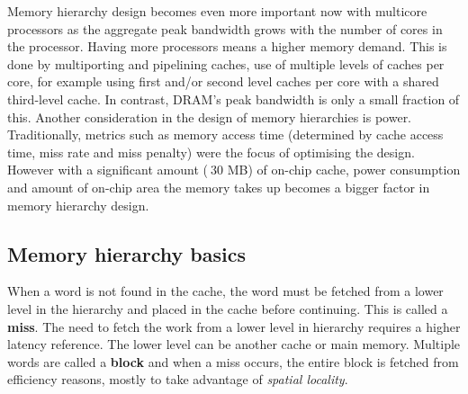 \documentclass[11pt]{article}
\begin{document}
\noindent
Memory hierarchy design becomes even more important now with multicore processors as the aggregate peak bandwidth grows with the number of cores in the processor. Having more processors means a higher memory demand. This is done by multiporting and pipelining caches, use of multiple levels of caches per core, for example using first and/or second level caches per core with a shared third-level cache. In contrast, DRAM's peak bandwidth is only a small fraction of this.
\n
Another consideration in the design of memory hierarchies is power. Traditionally, metrics such as memory access time (determined by cache access time, miss rate and miss penalty) were the focus of optimising the design. However with a significant amount ($\>30$ MB) of on-chip cache, power consumption and amount of on-chip area the memory takes up becomes a bigger factor in memory hierarchy design. 

\subsection{Memory hierarchy basics}
When a word is not found in the cache, the word must be fetched from a lower level in the hierarchy and placed in the cache before continuing. This is called a \textbf{miss}. The need to fetch the work from a lower level in hierarchy requires a higher latency reference. The lower level can be another cache or main memory. Multiple words are called a \textbf{block} and when a miss occurs, the entire block is fetched from efficiency reasons, mostly to take advantage of \textit{spatial locality}.
\end{document}
